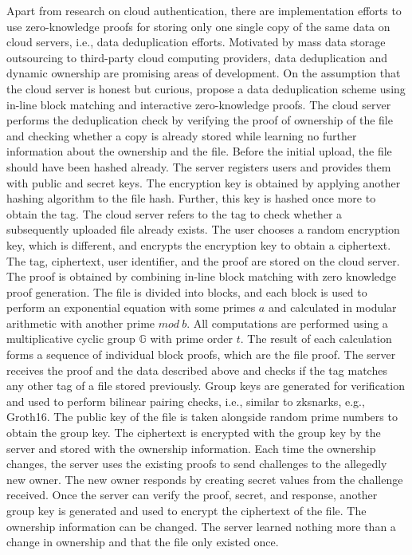 Apart from research on cloud authentication, there are implementation efforts to use zero-knowledge proofs for storing only one single copy of the same data on cloud servers, i.e., data deduplication efforts. Motivated by mass data storage outsourcing to third-party cloud computing providers, data deduplication and dynamic ownership are promising areas of development. On the assumption that the cloud server is honest but curious, \citet{Kanagamani} propose a data deduplication scheme using in-line block matching and interactive zero-knowledge proofs. The cloud server performs the deduplication check by verifying the proof of ownership of the file and checking whether a copy is already stored while learning no further information about the ownership and the file. Before the initial upload, the file should have been hashed already. The server registers users and provides them with public and secret keys. The encryption key is obtained by applying another hashing algorithm to the file hash.
Further, this key is hashed once more to obtain the tag. The cloud server refers to the tag to check whether a subsequently uploaded file already exists. The user chooses a random encryption key, which is different, and encrypts the encryption key to obtain a ciphertext. The tag, ciphertext, user identifier, and the proof are stored on the cloud server. The proof is obtained by combining in-line block matching with zero knowledge proof generation. The file is divided into blocks, and each block is used to perform an exponential equation with some primes \(a\) and calculated in modular arithmetic with another prime \(mod \ b\). All computations are performed using a multiplicative cyclic group \begin{math} \mathbb{G} \end{math} with prime order \(t\). The result of each calculation forms a sequence of individual block proofs, which are the file proof. The server receives the proof and the data described above and checks if the tag matches any other tag of a file stored previously. Group keys are generated for verification and used to perform bilinear pairing checks, i.e., similar to \acrshort{zksnark}s, e.g., Groth16. The public key of the file is taken alongside random prime numbers to obtain the group key. The ciphertext is encrypted with the group key by the server and stored with the ownership information. Each time the ownership changes, the server uses the existing proofs to send challenges to the allegedly new owner. The new owner responds by creating secret values from the challenge received. Once the server can verify the proof, secret, and response, another group key is generated and used to encrypt the ciphertext of the file. The ownership information can be changed. The server learned nothing more than a change in ownership and that the file only existed once. 

